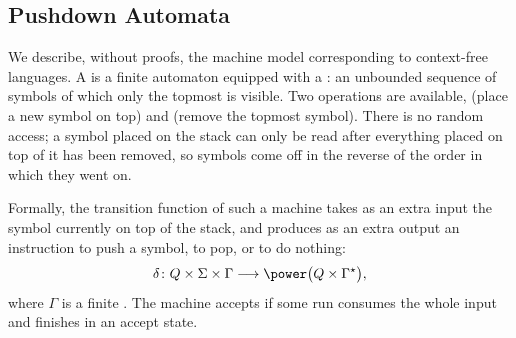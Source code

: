 \subsection{Pushdown Automata}

We describe, without proofs, the machine model corresponding to context-free languages. A  is a finite automaton equipped with a : an unbounded sequence of symbols of which only the topmost is visible. Two operations are available,  (place a new symbol on top) and  (remove the topmost symbol). There is no random access; a symbol placed on the stack can only be read after everything placed on top of it has been removed, so symbols come off in the reverse of the order in which they went on.

\begin{center}
\end{center}

Formally, the transition function of such a machine takes as an extra input the symbol currently on top of the stack, and produces as an extra output an instruction to push a symbol, to pop, or to do nothing:
$$\delta \colon Q \times \Sigma \times \Gamma \longrightarrow \power\big(Q \times \Gamma^\star\big),$$
where $\Gamma$ is a finite . The machine accepts if some run consumes the whole input and finishes in an accept state.

